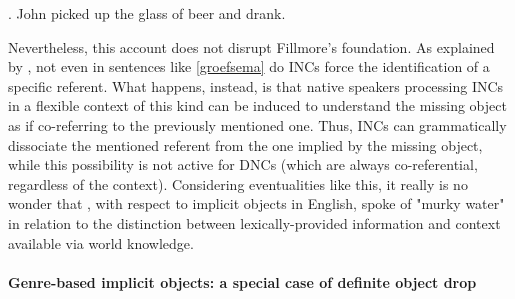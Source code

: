 \ex. \label{groefsema} John picked up the glass of beer and drank.

Nevertheless, this account does not disrupt Fillmore's foundation. As explained by \textcite[527]{Eu2018}, not even in sentences like \ref{groefsema} do INCs force the identification of a specific referent. What happens, instead, is that native speakers processing INCs in a flexible context of this kind can be induced to understand the missing object as if co-referring to the previously mentioned one. Thus, INCs can grammatically dissociate the mentioned referent from the one implied by the missing object, while this possibility is not active for DNCs (which are always co-referential, regardless of the context). Considering eventualities like this, it really is no wonder that \textcite[110]{Cote1996}, with respect to implicit objects in English, spoke of "murky water" in relation to the distinction between lexically-provided information and context available via world knowledge.



\paragraph{Genre-based implicit objects: a special case of definite object drop} 

